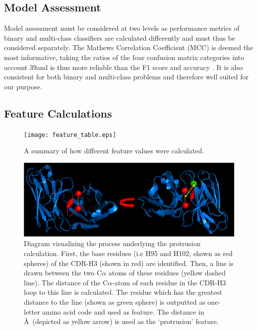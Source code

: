 \documentclass[12pt]{article}
\begin{document}
\subsection{Model Assessment} 
Model assessment must be considered at two levels as performance
metrics of binary and multi-class classifiers are calculated
differently and must thus be considered separately. The Mathews
Correlation Coefficient (MCC)\cite{Matthews1975} is deemed the most
informative, taking the ratios of the four confusion matrix categories
into account 39and is thus more reliable than the F1 score and
accuracy . It is also consistent for both binary and multi-class
problems and therefore well suited for our purpose.
 
\subsection{Feature Calculations}
\begin{figure}
  \centering
  \texttt{[image: feature\_table.eps]}
  \caption {A summary of how different feature values were calculated.}
  \label{fig:feature_table}
\end{figure}

\begin{figure}
  \includegraphics[scale=0.6]{angle.eps}
  \caption {Diagram visualizing the process underlying the protrusion
    calculation. First, the base residues (i.e H95 and H102, shown as
    red spheres) of the CDR-H3 (shown in red) are identified. Then, a
    line is drawn between the two C$\alpha$ atoms of these residues (yellow
    dashed line). The distance of the C$\alpha$-atom of each residue in the
    CDR-H3 loop to this line is calculated. The residue which has the
    greatest distance to the line (shown as green sphere) is outputted
    as one-letter amino acid code and used as feature. The distance in
    \AA\ (depicted as yellow arrow) is used as the `protrusion'
    feature. }
  \label{fig:angle}
\end{figure}
\end{document}

